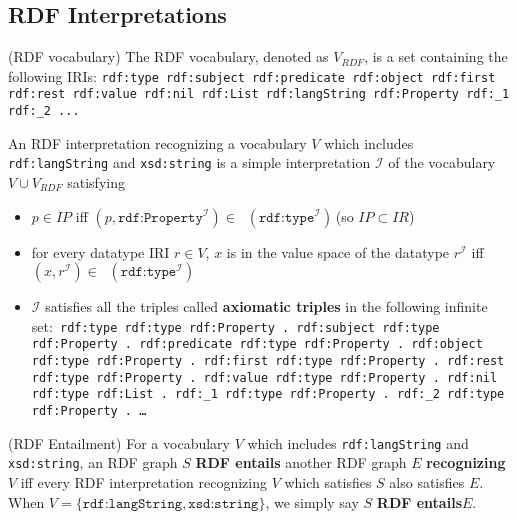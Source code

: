\documentclass{article}
\DeclareMathOperator{\IEXT}{I_{EXT}}
\begin{document}
\subsection{RDF Interpretations}
\begin{defin}(RDF vocabulary)\newline
The RDF vocabulary, denoted as $V_{RDF}$, is a set containing the following IRIs:\newline
\texttt{rdf:type rdf:subject rdf:predicate rdf:object rdf:first rdf:rest rdf:value rdf:nil rdf:List rdf:langString rdf:Property rdf:\_1 rdf:\_2 ...}
\end{defin}
\begin{defin}
An RDF interpretation recognizing a vocabulary $V$ which includes \texttt{rdf:langString} and \texttt{xsd:string} is a simple interpretation $\mathcal{I}$ of the vocabulary $V \cup V_{RDF}$ satisfying 
\begin{itemize}
\item $p \in IP$ iff $(p,\texttt{rdf:Property}^{\mathcal{I}}) \in \IEXT(\texttt{rdf:type}^{\mathcal{I}})$\,(so $IP \subset IR$)
\item for every datatype IRI $r \in V$, $x$ is in the value space of the datatype $r^{\mathcal{I}}$ iff $(x,r^{\mathcal{I}}) \in \IEXT(\texttt{rdf:type}^{\mathcal{I}})$
\item $\mathcal{I}$ satisfies all the triples called \textbf{axiomatic triples} in the following infinite set:\newline\texttt{
rdf:type rdf:type rdf:Property .\newline
rdf:subject rdf:type rdf:Property .\newline
rdf:predicate rdf:type rdf:Property . \newline
rdf:object rdf:type rdf:Property . \newline
rdf:first rdf:type rdf:Property . \newline
rdf:rest rdf:type rdf:Property . \newline
rdf:value rdf:type rdf:Property . \newline
rdf:nil rdf:type rdf:List . \newline
rdf:\_1 rdf:type rdf:Property . \newline
rdf:\_2 rdf:type rdf:Property . \newline
\dots}
\end{itemize}
\end{defin}

\begin{defin}(RDF Entailment)\newline
For a vocabulary $V$ which includes \texttt{rdf:langString} and \texttt{xsd:string}, an RDF graph $S$ \textbf{RDF entails} another RDF graph $E$ \textbf{recognizing $V$} iff every RDF interpretation recognizing $V$ which satisfies $S$ also satisfies $E$. When $V = \{\texttt{rdf:langString}, \texttt{xsd:string}\}$, we simply say $S$ \textbf{RDF entails}$E$.
\end{defin}
\end{document}
